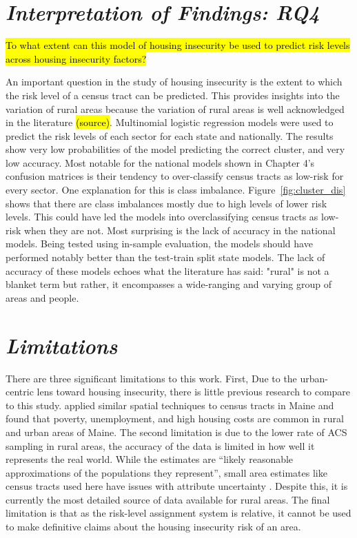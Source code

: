 \section{\textit{Interpretation of Findings: RQ4}}
\hl{To what extent can this model of housing insecurity be used to predict risk levels across housing insecurity factors?}

An important question in the study of housing insecurity is the extent to which the risk level of a census tract can be predicted. This provides insights into the variation of rural areas because the variation of rural areas is well acknowledged in the literature \hl{(source)}. Multinomial logistic regression models were used to predict the risk levels of each sector for each state and nationally. The results show very low probabilities of the model predicting the correct cluster, and very low accuracy. Most notable for the national models shown in Chapter 4's confusion matrices is their tendency to over-classify census tracts as low-risk for every sector. One explanation for this is class imbalance. Figure~\ref{fig:cluster_dis} shows that there are class imbalances mostly due to high levels of lower risk levels. This could have led the models into overclassifying census tracts as low-risk when they are not. Most surprising is the lack of accuracy in the national models. Being tested using in-sample evaluation, the models should have performed notably better than the test-train split state models. The lack of accuracy of these models echoes what the literature has said: "rural" is not a blanket term but rather, it encompasses a wide-ranging and varying group of areas and people. 


\section{\textit{Limitations}}

There are three significant limitations to this work. First, Due to the urban-centric lens toward housing insecurity, there is little previous research to compare to this study. \citet{gleason_using_2021} applied similar spatial techniques to census tracts in Maine and found that poverty, unemployment, and high housing costs are common in rural and urban areas of Maine. The second limitation is due to the lower rate of ACS sampling in rural areas, the accuracy of the data is limited in how well it represents the real world. While the estimates are “likely reasonable approximations of the populations they represent”, small area estimates like census tracts used here have issues with attribute uncertainty \citep{spielman_patterns_2014}. Despite this, it is currently the most detailed source of data available for rural areas. The final limitation is that as the risk-level assignment system is relative, it cannot be used to make definitive claims about the housing insecurity risk of an area.  



\endinput